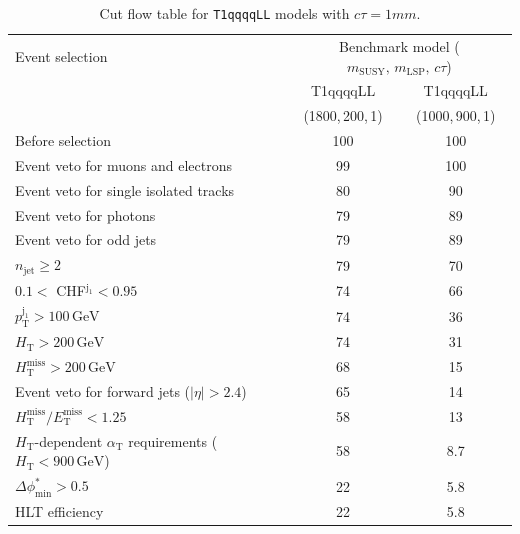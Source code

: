 \begin{table}[!h]
  \caption{Cut flow table for \texttt{T1qqqqLL} models with $c\tau = 1\unit{mm}$.} 
  \label{tab:cut_flow_ctau_1}
{\scriptsize%
\centering
\begin{tabular}{lcc}
  \hline
  Event selection & \multicolumn{2}{c}{Benchmark model ($m_\mathrm{SUSY},\,m_\mathrm{LSP},\,c\tau$)} \\
  \cline{2-3}
   & T1qqqqLL & T1qqqqLL \\
    & (1800,\,200,\,1) & (1000,\,900,\,1) \\
  \hline
  Before selection  & 100\phantom{.1} & 100\phantom{.1} \\
  Event veto for muons and electrons & \phantom{1}99\phantom{.1} & 100\phantom{.1} \\
  Event veto for single isolated tracks & \phantom{1}80\phantom{.1} & \phantom{1}90\phantom{.1} \\
  Event veto for photons & \phantom{1}79\phantom{.1} & \phantom{1}89\phantom{.1} \\
  Event veto for odd jets & \phantom{1}79\phantom{.1} & \phantom{1}89\phantom{.1} \\
   $n_{\mathrm{jet}} \geq 2$  & \phantom{1}79\phantom{.1} & \phantom{1}70\phantom{.1} \\
   $0.1 <$ CHF$^{\mathrm{j_1}} < 0.95$ & \phantom{1}74\phantom{.1} & \phantom{1}66\phantom{.1} \\
   $p_{\mathrm{T}}^{\mathrm{j_1}} > 100\,\mathrm{GeV}$ & \phantom{1}74\phantom{.1} & \phantom{1}36\phantom{.1} \\
   $H_{\mathrm{T}} > 200\,\mathrm{GeV}$  & \phantom{1}74\phantom{.1} & \phantom{1}31\phantom{.1} \\
  $H_{\mathrm{T}}^{\mathrm{miss}} > 200\,\mathrm{GeV}$  & \phantom{1}68\phantom{.1} & \phantom{1}15\phantom{.1} \\
  Event veto for forward jets ($|\eta| > 2.4$) & \phantom{1}65\phantom{.1} & \phantom{1}14\phantom{.1} \\
  $H_{\mathrm{T}}^{\mathrm{miss}} / E_{\mathrm{T}}^{\mathrm{miss}} < 1.25$ & \phantom{1}58\phantom{.1} & \phantom{1}13\phantom{.1} \\
  $H_{\mathrm{T}}$-dependent $\alpha_{\mathrm{T}}$ requirements ($H_{\mathrm{T}} < 900\,\mathrm{GeV}$)  & \phantom{1}58\phantom{.1} & \phantom{10}8.7 \\
  $\Delta\phi^{*}_{\mathrm{min}} > 0.5$  & \phantom{1}22\phantom{.1} & \phantom{10}5.8 \\
  \hline
  HLT efficiency & \phantom{1}22\phantom{.1} & \phantom{10}5.8  \\
  \hline
\end{tabular}
}
\end{table}

